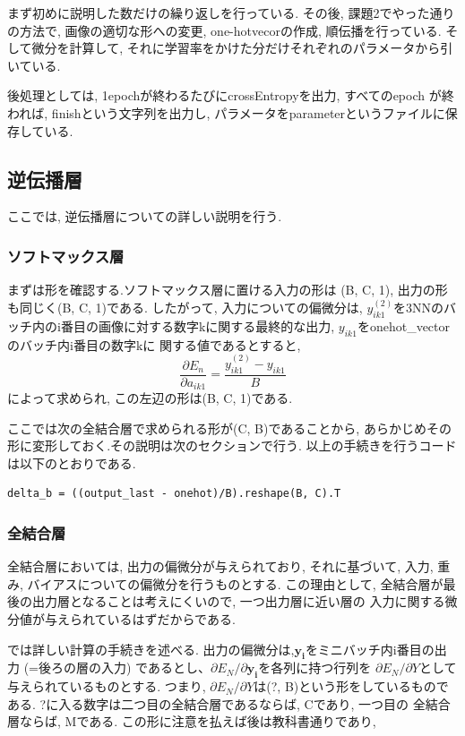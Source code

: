 \documentclass[a4paper,11pt]{jsarticle}
\begin{document}
まず初めに説明した数だけの繰り返しを行っている.
その後, 課題2でやった通りの方法で, 画像の適切な形への変更,
one-hotvecorの作成, 順伝播を行っている. そして微分を計算して,
それに学習率をかけた分だけそれぞれのパラメータから引いている.
\par
後処理としては, 1epochが終わるたびにcrossEntropyを出力, すべてのepoch
が終われば, finishという文字列を出力し, パラメータをparameterというファイルに保存している.

\subsection*{逆伝播層}
ここでは, 逆伝播層についての詳しい説明を行う.
\subsubsection*{ソフトマックス層}
まずは形を確認する.ソフトマックス層に置ける入力の形は
(B, C, 1), 出力の形も同じく(B, C, 1)である. したがって, 入力についての偏微分は,
$y_{ik1}^{(2)}$を3NNのバッチ内のi番目の画像に対する数字kに関する最終的な出力, $y_{ik1}$をonehot\_vectorのバッチ内i番目の数字kに
関する値であるとすると,
$$\frac{\partial E_n}{\partial a_{ik1}} = \frac{y_{ik1}^{(2)} - y_{ik1}}{B}$$
によって求められ, この左辺の形は(B, C, 1)である.
\par
ここでは次の全結合層で求められる形が(C, B)であることから,
あらかじめその形に変形しておく.その説明は次のセクションで行う.
以上の手続きを行うコードは以下のとおりである.
\begin{lstlisting}[caption=SoftMax]
  delta_b = ((output_last - onehot)/B).reshape(B, C).T
\end{lstlisting}

\subsubsection*{全結合層}
全結合層においては, 出力の偏微分が与えられており, それに基づいて,
入力, 重み, バイアスについての偏微分を行うものとする. この理由として,
全結合層が最後の出力層となることは考えにくいので, 一つ出力層に近い層の
入力に関する微分値が与えられているはずだからである.\par
では詳しい計算の手続きを述べる.
出力の偏微分は,$\bm{y_i}$をミニバッチ内i番目の出力
(=後ろの層の入力)
であるとし、$\partial E_N / \partial \bm{y_i}$を各列に持つ行列を
$\partial E_N / \partial Y$として与えられているものとする.
つまり, $\partial E_N / \partial Y$は(?, B)という形をしているものである.
?に入る数字は二つ目の全結合層であるならば, Cであり, 一つ目の
全結合層ならば, Mである. この形に注意を払えば後は教科書通りであり,
\end{document}
